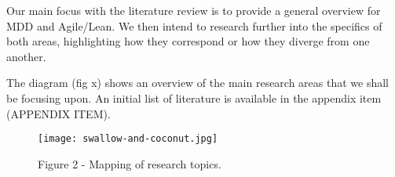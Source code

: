 \documentclass[ProjectPlan_innit.tex]{subfiles}
\begin{document}
Our main focus with the literature review is to provide a general overview for MDD and Agile/Lean. We then intend to research further into the specifics of both areas, highlighting how they correspond or how they diverge from one another. 

\hspace{0pt} 
The diagram (fig x) shows an overview of the main research areas that we shall be focusing upon. An initial list of literature is available in the appendix item (APPENDIX ITEM).
\hspace{0pt}



\begin{figure}[h]
  \texttt{[image: swallow-and-coconut.jpg]}
  \caption{Figure 2 - Mapping of research topics.}
  \label{BBB}
\end{figure}
\end{document}
